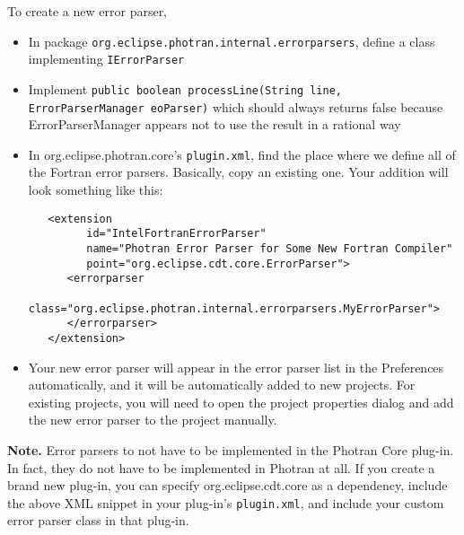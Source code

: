 To create a new error parser,
\begin{itemize}

\item In package \texttt{org.eclipse.photran.internal.errorparsers},
  define a class implementing \texttt{IErrorParser}

\item Implement \texttt{public boolean processLine(String line,
ErrorParserManager eoParser)}
  which should always returns false because ErrorParserManager appears not to
  use the result in a rational way

\item In org.eclipse.photran.core's \texttt{plugin.xml}, find the place
where we define all of the Fortran error parsers.  Basically, copy an
existing one.  Your addition will look something like this:
\begin{verbatim}
   <extension
         id="IntelFortranErrorParser"
         name="Photran Error Parser for Some New Fortran Compiler"
         point="org.eclipse.cdt.core.ErrorParser">
      <errorparser
            class="org.eclipse.photran.internal.errorparsers.MyErrorParser">
      </errorparser>
   </extension>
\end{verbatim}

\item Your new error parser will appear in the error parser list in the
Preferences automatically, and it will be automatically added to new projects.
For existing projects, you will need to open the project properties dialog
and add the new error parser to the project manually.

\end{itemize}

\textbf{Note.}  Error parsers to not have to be implemented in the Photran
Core plug-in.  In fact, they do not have to be implemented in Photran at all.
If you create a brand new plug-in, you can specify org.eclipse.cdt.core
as a dependency, include the above XML snippet in your plug-in's
\texttt{plugin.xml}, and include your custom error parser class in that
plug-in.
